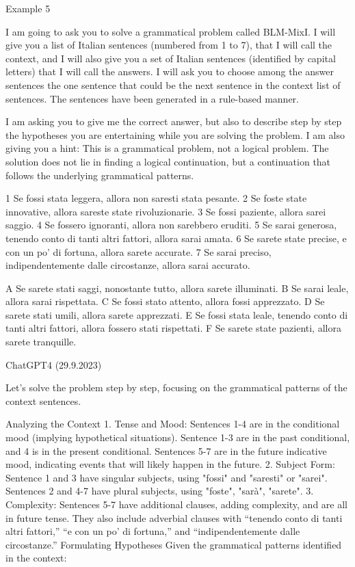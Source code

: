 Example 5

I am going to ask you to solve a grammatical problem called BLM-MixI.  I will give you a list of Italian sentences (numbered from 1 to 7), that I will call the context, and I will also give you a set of Italian sentences (identified by capital letters) that I will call  the answers. I will ask you to choose among the answer sentences the one sentence that could be the next sentence in the context list of sentences. The sentences have been generated in a rule-based manner. 

I am asking you to give me the correct answer, but also to describe step by step  the hypotheses you are entertaining while you are solving the problem.
I am also giving you a hint: This is a grammatical problem, not a logical problem. The solution does not lie in finding a logical continuation, but a continuation that follows the underlying grammatical patterns.


1 Se fossi stata leggera, allora non saresti stata pesante.
2 Se foste state innovative, allora sareste state rivoluzionarie.
3 Se fossi paziente, allora sarei saggio.
4 Se fossero ignoranti, allora non sarebbero eruditi.
5 Se sarai generosa, tenendo conto di tanti altri fattori, allora sarai amata.
6 Se sarete state precise, e con un po' di fortuna, allora sarete accurate.
7 Se sarai preciso, indipendentemente dalle circostanze, allora sarai accurato.


A Se sarete stati saggi, nonostante tutto, allora sarete illuminati.
B Se sarai leale, allora sarai rispettata.
C Se fossi stato attento, allora fossi apprezzato.
D Se sarete stati umili, allora sarete apprezzati.
E Se fossi stata leale, tenendo conto di tanti altri fattori, allora fossero stati rispettati.
F Se sarete state pazienti, allora sarete tranquille.

ChatGPT4 (29.9.2023)

Let's solve the problem step by step, focusing on the grammatical patterns of the context sentences.

Analyzing the Context
1. Tense and Mood:
Sentences 1-4 are in the conditional mood (implying hypothetical situations). Sentence 1-3 are in the past conditional, and 4 is in the present conditional.
Sentences 5-7 are in the future indicative mood, indicating events that will likely happen in the future.
2. Subject Form:
Sentence 1 and 3 have singular subjects, using "fossi" and "saresti" or "sarei".
Sentences 2 and 4-7 have plural subjects, using "foste", "sarà", "sarete".
3. Complexity:
Sentences 5-7 have additional clauses, adding complexity, and are all in future tense. They also include adverbial clauses with “tenendo conto di tanti altri fattori,” “e con un po' di fortuna,” and “indipendentemente dalle circostanze.”
Formulating Hypotheses
Given the grammatical patterns identified in the context:

